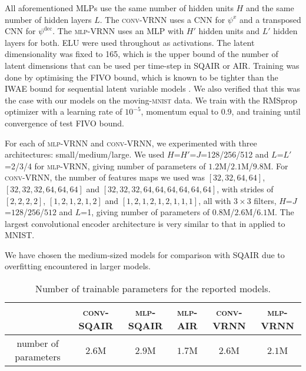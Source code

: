     All aforementioned \glspl{MLP} use the same number of hidden units $H$ and the same number of hidden layers $L$.
    The \textsc{conv}-\gls{VRNN} uses a \gls{CNN} for $\psi^{x}$ and a transposed \gls{CNN} for $\psi^{\mathrm{dec}}$. The \textsc{mlp}-\gls{VRNN} uses an \gls{MLP} with $H'$ hidden units  and $L'$ hidden layers for both. 
    \Gls{ELU} were used throughout as activations. The latent dimensionality was fixed to 165, which is the upper bound of the number of latent dimensions that can be used per time-step in \gls{SQAIR} or \gls{AIR}. Training was done by optimising the \gls{FIVO} bound, which is known to be tighter than the \gls{IWAE} bound for sequential latent variable models \citep{Maddison2017filtering}. We also verified that this was the case with our models on the moving-\textsc{mnist} data. We train with the \gls{RMSprop} optimizer with a learning rate of $10^{-5}$, momentum equal to $0.9$, and training until convergence of test \gls{FIVO} bound.
    
    For each of \textsc{mlp}-\gls{VRNN} and \textsc{conv}-\gls{VRNN}, we experimented with three architectures: small/medium/large. 
    We used $H$=$H'$=$J$=128/256/512 and $L$=$L'$=2/3/4 for \textsc{mlp}-\gls{VRNN}, giving number of parameters of $1.2$M/$2.1$M/$9.8$M. 
    For \textsc{conv}-\gls{VRNN}, the number of features maps we used was $[32,32,64,64]$, $[32,32,32,64,64,64]$ and $[32,32,32,64,64,64,64,64,64]$, with strides of $[2,2,2,2]$, $[1,2,1,2,1,2]$ and $[1,2,1,2,1,2,1,1,1]$, all with $3 \times 3$ filters, $H$=$J$=$128$/$256$/$512$ and $L$=1, giving number of parameters of $0.8$M/$2.6$M/$6.1$M. 
    The largest convolutional encoder architecture is very similar to that in \cite{Gulrajani2016pixelvae} applied to \gls{MNIST}.
    
    We have chosen the medium-sized models for comparison with \gls{SQAIR} due to overfitting encountered in larger models.

\begin{table}
    \centering
    \caption{Number of trainable parameters for the reported models.}
    \label{tab:num_params}
    \begin{tabular}{c|c|c|c|c|c}
         & \textsc{conv}-\gls{SQAIR} & \textsc{mlp}-\gls{SQAIR} & \textsc{mlp}-\gls{AIR} & \textsc{conv}-\gls{VRNN} & \textsc{mlp}-\gls{VRNN}\\
                         \hline
         number of parameters & $2.6$M & $2.9$M & $1.7$M & $2.6$M  & $2.1$M 
    \end{tabular}
\end{table}

